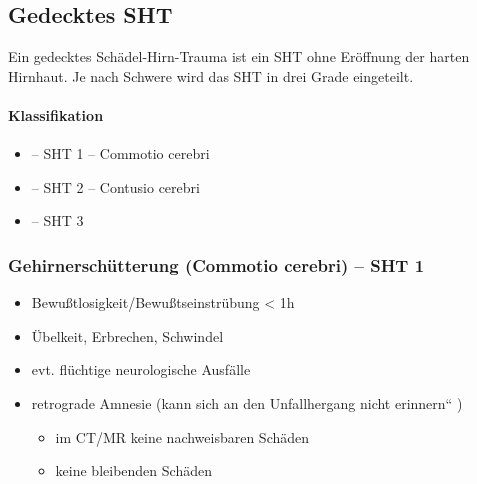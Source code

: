 \subsection{Gedecktes SHT}

Ein gedecktes Schädel-Hirn-Trauma ist ein SHT ohne Eröffnung der harten Hirnhaut. Je nach Schwere wird das SHT in drei Grade eingeteilt.
 
\paragraph{Klassifikation}

\begin{itemize}
\item {} -- SHT 1{\textdegree} --
Commotio cerebri
\item {} -- SHT 2{\textdegree} -- Contusio
cerebri
\item {} -- SHT 3{\textdegree} 
\end{itemize}

\subsubsection{Gehirnersch\"utterung (Commotio cerebri) --
SHT 1\textdegree}

{
\begin{itemize}
    \item  Bewu{\ss}tlosigkeit/Bewu{\ss}tseinstr\"ubung {\textless}  1h
    \item \"Ubelkeit, Erbrechen, Schwindel
    \item evt. fl\"uchtige neurologische Ausf\"alle
    \item retrograde  Amnesie  ({\quotedblbase}kann sich an den
    Unfallhergang nicht erinnern{\textquotedblleft} )
    \begin{itemize}
        \item im CT/MR 
        keine nachweisbaren Sch\"aden
        \item keine  bleibenden Sch\"aden
    \end{itemize}
\end{itemize}}

